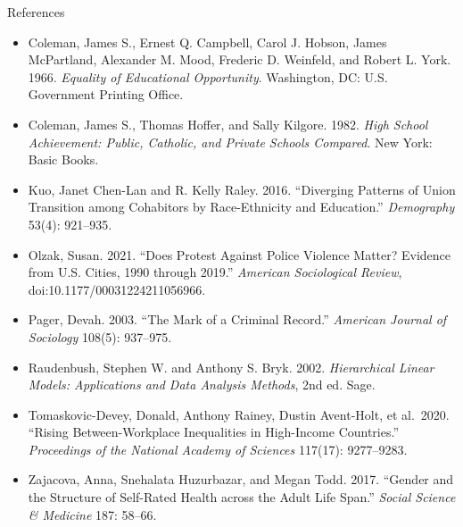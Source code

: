 \documentclass[aspectratio=169,11pt,xcolor=dvipsnames]{beamer}
\begin{document}
\begin{frame}[allowframebreaks,t]{References}
\begin{itemize}
A Multinomial Transition Model.'' \textit{American Sociological Review} 65(5):
754--772.
\item Coleman, James S., Ernest Q. Campbell, Carol J. Hobson, James McPartland,
Alexander M. Mood, Frederic D. Weinfeld, and Robert L. York. 1966.
\textit{Equality of Educational Opportunity}. Washington, DC: U.S. Government
Printing Office.
\item Coleman, James S., Thomas Hoffer, and Sally Kilgore. 1982. \textit{High
School Achievement: Public, Catholic, and Private Schools Compared}. New York:
Basic Books.
\item Kuo, Janet Chen-Lan and R. Kelly Raley. 2016. ``Diverging Patterns of
Union Transition among Cohabitors by Race-Ethnicity and Education.''
\textit{Demography} 53(4): 921--935.
\item Olzak, Susan. 2021. ``Does Protest Against Police Violence Matter?
Evidence from U.S. Cities, 1990 through 2019.'' \textit{American Sociological
Review}, doi:10.1177/00031224211056966.
\item Pager, Devah. 2003. ``The Mark of a Criminal Record.'' \textit{American
Journal of Sociology} 108(5): 937--975.
\item Raudenbush, Stephen W. and Anthony S. Bryk. 2002. \textit{Hierarchical
Linear Models: Applications and Data Analysis Methods}, 2nd ed. Sage.
\item Tomaskovic-Devey, Donald, Anthony Rainey, Dustin Avent-Holt, et al.\ 2020.
``Rising Between-Workplace Inequalities in High-Income Countries.''
\textit{Proceedings of the National Academy of Sciences} 117(17): 9277--9283.
\item Zajacova, Anna, Snehalata Huzurbazar, and Megan Todd. 2017. ``Gender and
the Structure of Self-Rated Health across the Adult Life Span.'' \textit{Social
Science \& Medicine} 187: 58--66.
\end{itemize}
\end{frame}
\end{document}
